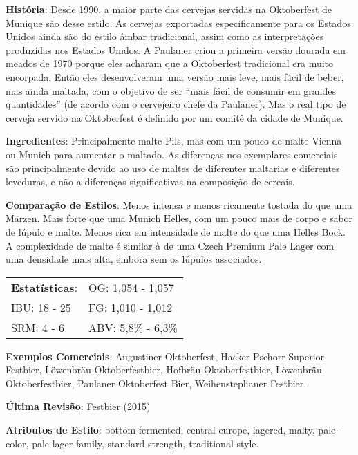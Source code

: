 \textbf{História}: Desde 1990, a maior parte das cervejas servidas na Oktoberfest de Munique são desse estilo. As cervejas exportadas especificamente para os Estados Unidos ainda são do estilo âmbar tradicional, assim como as interpretações produzidas nos Estados Unidos. A Paulaner criou a primeira versão dourada em meados de 1970 porque eles acharam que a Oktoberfest tradicional era muito encorpada. Então eles desenvolveram uma versão mais leve, mais fácil de beber, mas ainda maltada, com o objetivo de ser “mais fácil de consumir em grandes quantidades” (de acordo com o cervejeiro chefe da Paulaner). Mas o real tipo de cerveja servido na Oktoberfest é definido por um comitê da cidade de Munique.

\textbf{Ingredientes}: Principalmente malte Pils, mas com um pouco de malte Vienna ou Munich para aumentar o maltado. As diferenças nos exemplares comerciais são principalmente devido ao uso de maltes de diferentes maltarias e diferentes leveduras, e não a diferenças significativas na composição de cereais.

\textbf{Comparação de Estilos}: Menos intensa e menos ricamente tostada do que uma Märzen. Mais forte que uma Munich Helles, com um pouco mais de corpo e sabor de lúpulo e malte. Menos rica em intensidade de malte do que uma Helles Bock. A complexidade de malte é similar à de uma Czech Premium Pale Lager com uma densidade mais alta, embora sem os lúpulos associados.

\begin{tabular}{@{}p{35mm}p{35mm}@{}}
  \textbf{Estatísticas}: & OG: 1,054 - 1,057 \\
  IBU: 18 - 25  & FG: 1,010 - 1,012  \\
  SRM: 4 - 6   & ABV: 5,8\% - 6,3\%
\end{tabular}

\textbf{Exemplos Comerciais}: Augustiner Oktoberfest, Hacker-Pschorr Superior Festbier, Löwenbräu Oktoberfestbier, Hofbräu Oktoberfestbier, Löwenbräu Oktoberfestbier, Paulaner Oktoberfest Bier, Weihenstephaner Festbier.

\textbf{Última Revisão}: Festbier (2015)

\textbf{Atributos de Estilo}: bottom-fermented, central-europe, lagered, malty, pale-color, pale-lager-family, standard-strength, traditional-style.